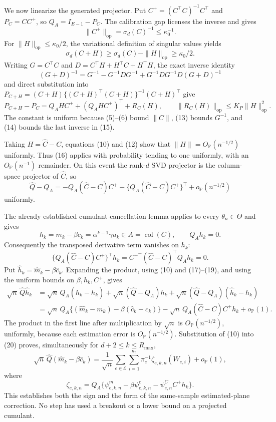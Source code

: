 We now linearize the generated projector.  Put \(C^+=(C^\top C)^{-1}C^\top\) and \(P_C=CC^+\), so \(Q_A=I_{E-1}-P_C\).  The calibration gap licenses the inverse and gives
\[
 \|C^+\|_{\mathrm{op}}=\sigma_d(C)^{-1}\leq\kappa_0^{-1}. \tag{13}
\]
For \(\|H\|_{\mathrm{op}}\leq\kappa_0/2\), the variational definition of singular values yields
\[
 \sigma_d(C+H)\geq\sigma_d(C)-\|H\|_{\mathrm{op}}
 \geq\kappa_0/2. \tag{14}
\]
Writing \(G=C^\top C\) and \(D=C^\top H+H^\top C+H^\top H\), the exact inverse identity
\[
 (G+D)^{-1}=G^{-1}-G^{-1}DG^{-1}
 +G^{-1}DG^{-1}D(G+D)^{-1} \tag{15}
\]
and direct substitution into
\(P_{C+H}=(C+H)\{(C+H)^\top(C+H)\}^{-1}(C+H)^\top\)
give
\[
 P_{C+H}-P_C
 =Q_AHC^+ +(Q_AHC^+)^\top+R_C(H),
 \qquad \|R_C(H)\|_{\mathrm{op}}
 \leq K_P\|H\|_{\mathrm{op}}^2. \tag{16}
\]
The constant is uniform because (5)--(6) bound \(\|C\|\), (13) bounds \(G^{-1}\), and (14) bounds the last inverse in (15).

Taking \(H=\widehat C-C\), equations (10) and (12) show that \(\|H\|=O_{\mathbb P}(n^{-1/2})\) uniformly.  Thus (16) applies with probability tending to one uniformly, with an \(O_{\mathbb P}(n^{-1})\) remainder.  On this event the rank-\(d\) SVD projector is the column-space projector of \(\widehat C\), so
\[
 \widehat Q-Q_A
 =-Q_A(\widehat C-C)C^+
  -\{Q_A(\widehat C-C)C^+\}^\top
  +o_{\mathbb P}(n^{-1/2}) \tag{17}
\]
uniformly.

The already established cumulant-cancellation lemma applies to every \(\theta_n\in\Theta\) and gives
\[
 h_k=m_k-\beta c_k=\alpha^{k-1}\gamma u_k\in A=\operatorname{col}(C),
 \qquad Q_Ah_k=0. \tag{18}
\]
Consequently the transposed derivative term vanishes on \(h_k\):
\[
 \{Q_A(\widehat C-C)C^+\}^\top h_k
 =C^{+\top}(\widehat C-C)^\top Q_Ah_k=0. \tag{19}
\]
Put \(\widehat h_k=\widehat m_k-\beta\widehat c_k\).  Expanding the product, using (10) and (17)--(19), and using the uniform bounds on \(\beta,h_k,C^+\), gives
\[
 \begin{aligned}
 \sqrt n\,\widehat Q\widehat h_k
 &=\sqrt n\,Q_A(\widehat h_k-h_k)
   +\sqrt n(\widehat Q-Q_A)h_k
   +\sqrt n(\widehat Q-Q_A)(\widehat h_k-h_k)\\
 &=\sqrt n\,Q_A\{(\widehat m_k-m_k)
       -\beta(\widehat c_k-c_k)\}
   -\sqrt n\,Q_A(\widehat C-C)C^+h_k
   +o_{\mathbb P}(1).
 \end{aligned} \tag{20}
\]
The product in the first line after multiplication by \(\sqrt n\) is \(O_{\mathbb P}(n^{-1/2})\), uniformly, because each estimation error is \(O_{\mathbb P}(n^{-1/2})\).  Substitution of (10) into (20) proves, simultaneously for \(d+2\leq k\leq R_{\max}\),
\[
 \sqrt n\,\widehat Q(\widehat m_k-\beta\widehat c_k)
 =\frac1{\sqrt n}\sum_{e\in\mathcal E}\sum_{i=1}^{n_e}
   \pi_e^{-1}\zeta_{e,k,n}(W_{e,i})+o_{\mathbb P}(1), \tag{21}
\]
where
\[
 \zeta_{e,k,n}
 =Q_A\{\psi^m_{e,k,n}-\beta\psi^c_{e,k,n}
          -\psi^C_{e,n}C^+h_k\}. \tag{22}
\]
This establishes both the sign and the form of the same-sample estimated-plane correction.  No step has used a breakout or a lower bound on a projected cumulant.

